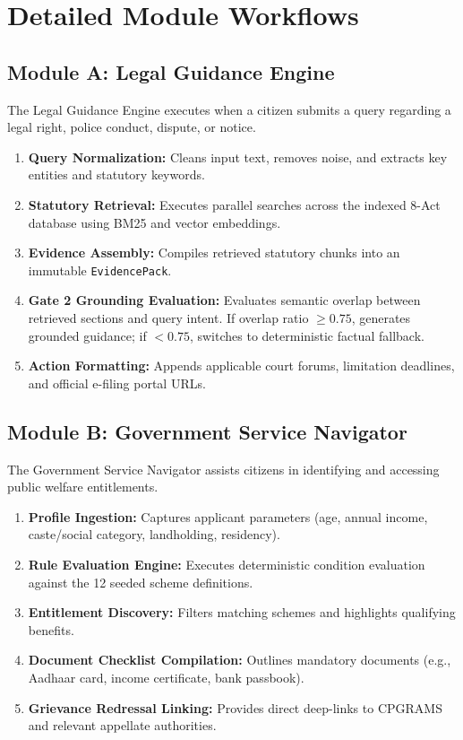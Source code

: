 \section{Detailed Module Workflows}
\label{sec:module_workflows}

\subsection{Module A: Legal Guidance Engine}
The Legal Guidance Engine executes when a citizen submits a query regarding a legal right, police conduct, dispute, or notice.
\begin{enumerate}
    \item \textbf{Query Normalization:} Cleans input text, removes noise, and extracts key entities and statutory keywords.
    \item \textbf{Statutory Retrieval:} Executes parallel searches across the indexed 8-Act database using BM25 and vector embeddings.
    \item \textbf{Evidence Assembly:} Compiles retrieved statutory chunks into an immutable \texttt{EvidencePack}.
    \item \textbf{Gate 2 Grounding Evaluation:} Evaluates semantic overlap between retrieved sections and query intent. If overlap ratio $\ge 0.75$, generates grounded guidance; if $< 0.75$, switches to deterministic factual fallback.
    \item \textbf{Action Formatting:} Appends applicable court forums, limitation deadlines, and official e-filing portal URLs.
\end{enumerate}

\subsection{Module B: Government Service Navigator}
The Government Service Navigator assists citizens in identifying and accessing public welfare entitlements.
\begin{enumerate}
    \item \textbf{Profile Ingestion:} Captures applicant parameters (age, annual income, caste/social category, landholding, residency).
    \item \textbf{Rule Evaluation Engine:} Executes deterministic condition evaluation against the 12 seeded scheme definitions.
    \item \textbf{Entitlement Discovery:} Filters matching schemes and highlights qualifying benefits.
    \item \textbf{Document Checklist Compilation:} Outlines mandatory documents (e.g., Aadhaar card, income certificate, bank passbook).
    \item \textbf{Grievance Redressal Linking:} Provides direct deep-links to CPGRAMS and relevant appellate authorities.
\end{enumerate}

